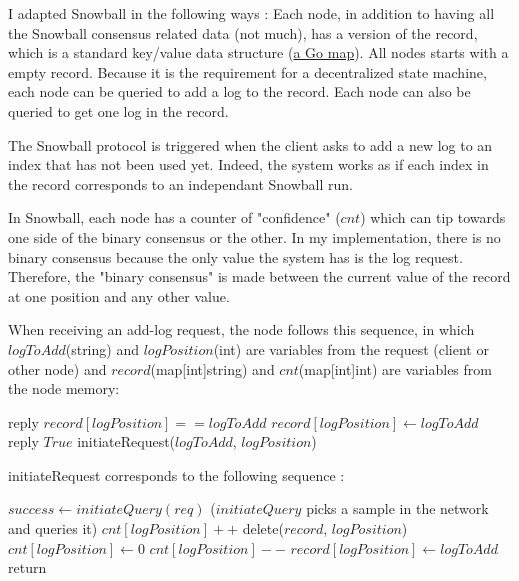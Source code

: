 \documentclass[11pt, twocolumn]{article}
\begin{document}
I adapted Snowball in the following ways : Each node, in addition to having all the Snowball consensus related data (not much), has a version of the record, which is a standard key/value data structure (\href{https://go.dev/blog/maps}{a Go map}). All nodes starts with a empty record.
Because it is the requirement for a decentralized state machine, each node can be queried to add a log to the record. Each node can also be queried to get one log in the record.

The Snowball protocol is triggered when the client asks to add a new log to an index that has not been used yet. Indeed, the system works as if each index in the record corresponds to an independant Snowball run.

In Snowball, each node has a counter of "confidence" ($cnt$) which can tip towards one side of the binary consensus or the other. In my implementation, there is no binary consensus because the only value the system has is the log request.
Therefore, the "binary consensus" is made between the current value of the record at one position and any other value.

When receiving an add-log request, the node follows this sequence, in which $logToAdd$(string) and $logPosition$(int) are variables from the request (client or other node) and $record$(map[int]string) and $cnt$(map[int]int) are variables from the node memory:
\\
\begin{algorithmic}
    \State reply $record[logPosition] == logToAdd$
    \Else
    \State $record[logPosition] \gets logToAdd$
    \State reply $True$
    \State initiateRequest($logToAdd$, $logPosition$)
    \EndIf
\end{algorithmic}

initiateRequest corresponds to the following sequence :

\begin{algorithmic}
    \State $success \gets initiateQuery(req)$
    \State ($initiateQuery$ picks a sample in the network and queries it)
    \State $cnt[logPosition]++$
    \Else
    \State delete($record$, $logPosition$)
    \State $cnt[logPosition] \gets 0$
    \Else
    \State $cnt[logPosition]--$
    \EndIf
    \EndIf
    \State $record[logPosition] \gets logToAdd$
    \State return
    \EndIf
    \EndWhile
\end{algorithmic}
\end{document}
